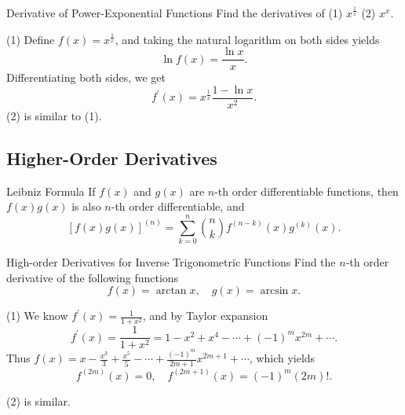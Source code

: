 \begin{example}{Derivative of Power-Exponential Functions}{}
  Find the derivatives of (1) $x^{\frac{1}{x}}$
  (2) $x^x$.
\end{example}

\begin{solution}
  (1) Define $f(x) = x^{\frac{1}{x}}$, and
  taking the natural logarithm on both sides yields
  \begin{equation}
    \ln f(x) = \frac{\ln x}{x}.
  \end{equation}
  Differentiating both sides, we get
  \begin{equation}
    f^{\prime}(x) = x^{\frac{1}{x}} \frac{1 - \ln x}{x^2}.
  \end{equation}
  (2) is similar to (1).
\end{solution}

\subsection{Higher-Order Derivatives}

\begin{proposition}{Leibniz Formula}{}
  If $f(x)$ and $g(x)$ are $n$-th order differentiable functions,
  then $f(x)g(x)$ is also $n$-th order differentiable, and
  \begin{equation}
    \left[ f(x)g(x) \right]^{(n)} = \sum\limits_{k = 0}^n \binom{n}{k} f^{(n-k)}(x) g^{(k)}(x).
  \end{equation}
\end{proposition}

\begin{example}{High-order Derivatives for Inverse Trigonometric Functions}{}
  Find the $n$-th order derivative of the following functions
  \begin{equation}
    f(x) = \arctan x, \quad
    g(x) = \arcsin x.
  \end{equation}
\end{example}

\begin{solution}
  (1) We know $f^{\prime}(x) = \frac{1}{1+x^2}$, and by Taylor expansion
  \begin{equation}
    f^{\prime}(x) = \frac{1}{1+x^2} = 1 - x^2 + x^4 - \cdots + (-1)^mx^{2m} + \cdots.
  \end{equation}
  Thus $f(x) = x - \frac{x^3}{3} + \frac{x^5}{5} - \cdots +
  \frac{(-1)^m}{2m+1}x^{2m+1} + \cdots$,
  which yields
  \begin{equation}
    f^{(2m)}(x) = 0, \quad f^{(2m+1)}(x) = (-1)^m (2m)!.
  \end{equation}

  (2) is similar.
\end{solution}

